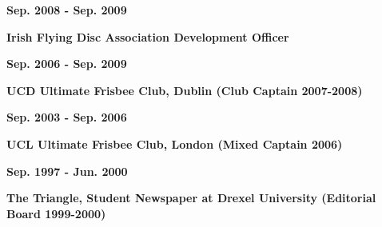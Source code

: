 \documentclass[line,a4paper]{resume}
\begin{document}
\begin{resume}
		\noindent
		\begin{minipage}[t]{0.25\linewidth}
		\textbf{Sep. 2008 - Sep. 2009}
		\end{minipage}
		\begin{minipage}[t]{0.75\linewidth}\raggedright
		\textbf{Irish Flying Disc Association Development Officer}
		\end{minipage}
		
		\noindent
		\begin{minipage}[t]{0.25\linewidth}
		\textbf{Sep. 2006 - Sep. 2009}
		\end{minipage}
		\begin{minipage}[t]{0.75\linewidth}\raggedright
		\textbf{UCD Ultimate Frisbee Club, Dublin (Club Captain 2007-2008)}
		\end{minipage}

		\noindent
		\begin{minipage}[t]{0.25\linewidth}
		\textbf{Sep. 2003 - Sep. 2006}
		\end{minipage}
		\begin{minipage}[t]{0.75\linewidth}\raggedright
		\textbf{UCL Ultimate Frisbee Club, London (Mixed Captain 2006)}
		\end{minipage}
			
		\noindent
		\begin{minipage}[t]{0.25\linewidth}
		\textbf{Sep. 1997 - Jun. 2000}
		\end{minipage}
		\begin{minipage}[t]{0.75\linewidth}\raggedright
		\textbf{The Triangle, Student Newspaper at Drexel University (Editorial Board 1999-2000)}
		\end{minipage}






\end{resume}
\end{document}
